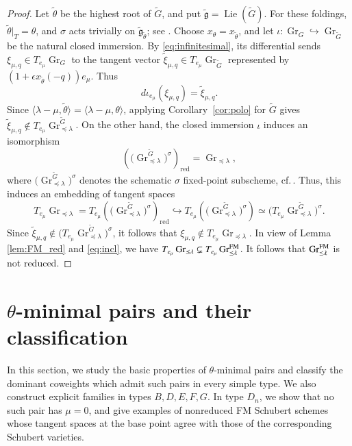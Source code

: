 \documentclass[a4paper, 12pt]{amsart}
\theoremstyle{definition}
\newcommand{\g}{\mathfrak g}
\DeclareMathOperator{\Gr}{\mathrm{Gr}}
\begin{document}
\begin{proof}
Let $\tilde{\theta}$ be the highest root of $\tilde{G}$, and put
$\tilde{\g}=\operatorname{Lie}(\tilde{G})$. For these foldings,
$\tilde{\theta}|_T=\theta$, and $\sigma$ acts trivially on
$\tilde{\g}_{\tilde{\theta}}$; see \cite[Lemma~4.3]{HongMV}.
Choose $x_\theta=x_{\tilde{\theta}}$, and let
$\iota:\Gr_G\hookrightarrow\Gr_{\tilde{G}}$ be the natural closed immersion.
By \eqref{eq:infinitesimal}, its differential sends
$\xi_{\mu,q}\in T_{e_\mu}\Gr_G$ to the tangent vector
$\tilde{\xi}_{\mu,q}\in T_{e_\mu}\Gr_{\tilde{G}}$ represented by
$(1+\epsilon x_{\tilde{\theta}}(-q))e_\mu$. Thus
\[
d\iota_{e_\mu}(\xi_{\mu,q})=\tilde{\xi}_{\mu,q}.
\]
Since $\langle\lambda-\mu,\tilde{\theta}\rangle
=\langle\lambda-\mu,\theta\rangle$, applying Corollary~\ref{cor:polo}
for $\tilde{G}$ gives
$\tilde{\xi}_{\mu,q}\notin T_{e_\mu}\Gr^{\tilde{G}}_{\preceq\lambda}$.
On the other hand, the closed immersion $\iota$ induces an isomorphism 
\[
\left (  \bigl(
\Gr_{\preceq\lambda}^{\widetilde G}
\bigr)^\sigma \right )_{\mathrm{red}}  = \Gr_{\preceq\lambda},
\]
where $ \bigl(\Gr_{\preceq\lambda}^{\widetilde G}
\bigr)^\sigma$ denotes the schematic $\sigma$ fixed-point subscheme, 
cf.\,\cite[Corollary 3.3]{HongMV}.
Thus, this induces an embedding of  tangent spaces 
\begin{equation}\label{eq:fold-tangent-inclusion}
T_{e_\mu}\Gr_{\preceq\lambda}=T_{e_\mu} \left (  \bigl(
\Gr_{\preceq\lambda}^{\widetilde G}
\bigr)^\sigma \right )_{\mathrm{red}} 
\hookrightarrow T_{e_\mu} \left ( \bigl(  
\Gr_{\preceq\lambda}^{\widetilde G}
   \bigr)  ^\sigma    \right)  \simeq
\bigl(T_{e_\mu}\Gr^{\tilde{G}}_{\preceq\lambda}\bigr)^\sigma.
\end{equation}
Since $\tilde{\xi}_{\mu,q}\notin \bigl(T_{e_\mu}\Gr^{\tilde{G}}_{\preceq\lambda}\bigr)^\sigma$, it follows that $\xi_{\mu,q}\notin T_{e_\mu}\Gr_{\preceq\lambda}$.  In view of Lemma \ref{lem:FM_red} and \eqref{eq:incl}, we have $T_{e_\mu}\Gr_{\preceq\lambda}\varsubsetneq T_{e_\mu}\Gr^{\rm FM}_{\preceq\lambda}$. It follows that $\Gr^{\rm FM}_{\preceq\lambda}$ is not reduced.
\end{proof}

\section{$\theta$-minimal pairs and their classification}\label{sect:adm}

In this section, we study the basic properties of $\theta$-minimal pairs and
classify the dominant coweights which admit such pairs in every simple type.
We also construct explicit families in types $B,D,E,F,G$.
In type $D_n$, we show that no such pair has $\mu=0$, and give examples of
nonreduced FM Schubert schemes whose tangent spaces at the base point agree
with those of the corresponding Schubert varieties.
\end{document}
